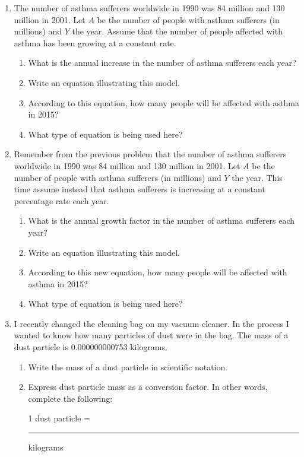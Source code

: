 \documentclass[12pt]{article}
\begin{document}
\begin{enumerate}
\newpage

\item The number of asthma sufferers worldwide in 1990 was 84 million and 130 million in 2001.  Let $A$ be the number of people with asthma sufferers (in millions) and $Y$ the year.  Assume that the number of people affected with asthma has been growing at a constant rate.

\begin{enumerate}
\item What is the annual increase in the number of asthma sufferers each year?
\vfill
\item Write an equation illustrating this model.
\vfill
\item According to this equation, how many people will be affected with asthma in 2015?
\vfill
\item What type of equation is being used here?
\vfill
\end{enumerate}

\newpage

\item  Remember from the previous problem that the number of asthma sufferers worldwide in 1990 was 84 million and 130 million in 2001.  Let $A$ be the number of people with asthma sufferers (in millions) and $Y$ the year.  This time assume instead that asthma sufferers is increasing at a constant percentage rate each year.

\begin{enumerate}
\item What is the annual growth factor in the number of asthma sufferers each year?
\vfill
\item Write an equation illustrating this model.
\vfill
\item According to this new equation, how many people will be affected with asthma in 2015?
\vfill
\item What type of equation is being used here?
\vfill
\end{enumerate}





\newpage

\item I recently changed the cleaning bag on my vacuum cleaner.  In the process I wanted to know how many particles of dust were in the bag.  The mass of a dust particle is 0.000000000753 kilograms.

\begin{enumerate}
\item Write the mass of a dust particle in scientific notation.
\vfill
\item Express dust particle mass as a conversion factor.  In other words, complete the following:
\vspace{0.2in}
\begin{center} 1 dust particle = \rule{1.5in}{.01in} kilograms \end{center}
\vspace{0.2in}


\end{enumerate}
\end{enumerate}
\end{document}
